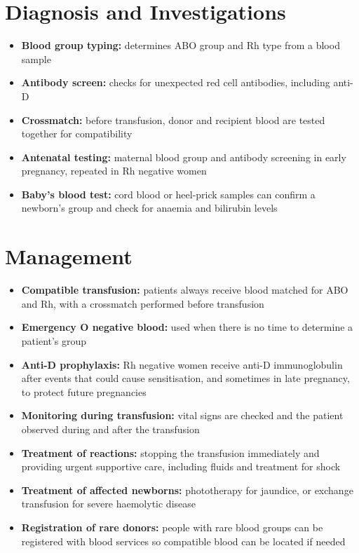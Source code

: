 \section*{Diagnosis and Investigations}
\begin{itemize}
    \item \textbf{Blood group typing:} determines ABO group and Rh type from a blood sample
    \item \textbf{Antibody screen:} checks for unexpected red cell antibodies, including anti-D
    \item \textbf{Crossmatch:} before transfusion, donor and recipient blood are tested together for compatibility
    \item \textbf{Antenatal testing:} maternal blood group and antibody screening in early pregnancy, repeated in Rh negative women
    \item \textbf{Baby's blood test:} cord blood or heel-prick samples can confirm a newborn's group and check for anaemia and bilirubin levels
\end{itemize}

\section*{Management}
\begin{itemize}
    \item \textbf{Compatible transfusion:} patients always receive blood matched for ABO and Rh, with a crossmatch performed before transfusion
    \item \textbf{Emergency O negative blood:} used when there is no time to determine a patient's group
    \item \textbf{Anti-D prophylaxis:} Rh negative women receive anti-D immunoglobulin after events that could cause sensitisation, and sometimes in late pregnancy, to protect future pregnancies
    \item \textbf{Monitoring during transfusion:} vital signs are checked and the patient observed during and after the transfusion
    \item \textbf{Treatment of reactions:} stopping the transfusion immediately and providing urgent supportive care, including fluids and treatment for shock
    \item \textbf{Treatment of affected newborns:} phototherapy for jaundice, or exchange transfusion for severe haemolytic disease
    \item \textbf{Registration of rare donors:} people with rare blood groups can be registered with blood services so compatible blood can be located if needed
\end{itemize}

